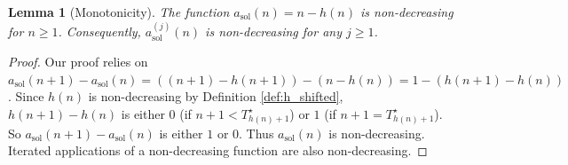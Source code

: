 \documentclass[11pt,a4paper]{article} %
\newtheorem{lemma}[theorem]{Lemma}
\theoremstyle{remark}
\begin{document}
\begin{lemma}[Monotonicity] \label{lem:mono_shifted}
The function $a_{\text{sol}}(n)=n-h(n)$ is non-decreasing for $n \ge 1$. Consequently, $a_{\text{sol}}^{(j)}(n)$ is non-decreasing for any $j \ge 1$.
\end{lemma}
\begin{proof}
Our proof relies on $a_{\text{sol}}(n+1)-a_{\text{sol}}(n) = ((n+1)-h(n+1)) - (n-h(n)) = 1 - (h(n+1)-h(n))$.
Since $h(n)$ is non-decreasing by Definition \ref{def:h_shifted}, $h(n+1)-h(n)$ is either $0$ (if $n+1 < T^{\star}_{h(n)+1}$) or $1$ (if $n+1 = T^{\star}_{h(n)+1}$).
So $a_{\text{sol}}(n+1)-a_{\text{sol}}(n)$ is either $1$ or $0$. Thus $a_{\text{sol}}(n)$ is non-decreasing.
Iterated applications of a non-decreasing function are also non-decreasing.
\end{proof}
\end{document}
